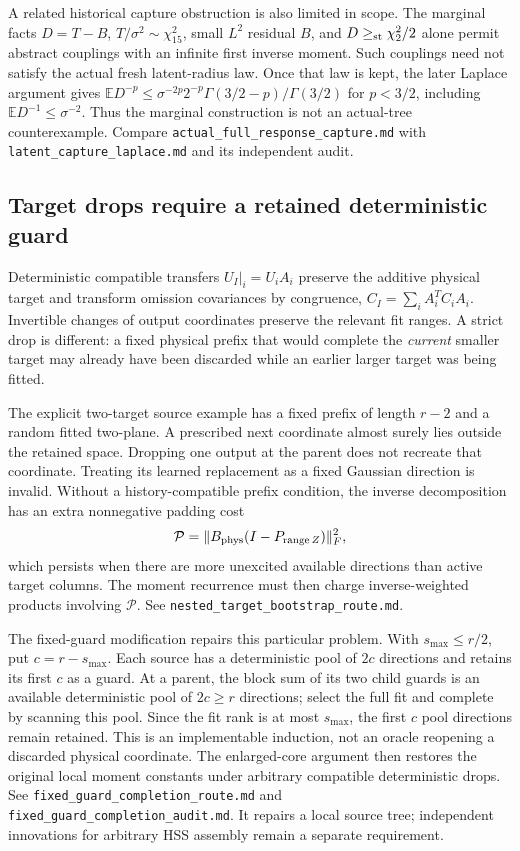 \documentclass[11pt,oneside,openany,a4paper]{book}
\numberwithin{equation}{chapter}
\theoremstyle{definition}
\theoremstyle{remark}
\newcommand{\sourcefile}[1]{{\small\nolinkurl{#1}}}
\begin{document}
A related historical capture obstruction is also limited in scope.
The marginal facts $D=T-B$, $T/\sigma^2\sim\chi^2_{15}$, small
$L^2$ residual $B$, and $D\ge_{\rm st}\chi^2_2/2$ alone permit abstract
couplings with an infinite first inverse moment.  Such couplings need
not satisfy the actual fresh latent-radius law.  Once that law is kept,
the later Laplace argument gives
$\mathbb ED^{-p}\le\sigma^{-2p}2^{-p}
\Gamma(3/2-p)/\Gamma(3/2)$ for $p<3/2$, including
$\mathbb ED^{-1}\le\sigma^{-2}$.  Thus the marginal construction is
not an actual-tree counterexample.  Compare
\sourcefile{actual_full_response_capture.md} with
\sourcefile{latent_capture_laplace.md} and its independent audit.

\subsection{Target drops require a retained deterministic guard}

Deterministic compatible transfers
$U_I|_i=U_iA_i$ preserve the additive physical target and transform
omission covariances by congruence,
$C_I=\sum_iA_i^TC_iA_i$.  Invertible changes of output coordinates
preserve the relevant fit ranges.  A strict drop is different: a fixed
physical prefix that would complete the \emph{current} smaller target
may already have been discarded while an earlier larger target was
being fitted.

The explicit two-target source example has a fixed prefix of length
$r-2$ and a random fitted two-plane.  A prescribed next coordinate
almost surely lies outside the retained space.  Dropping one output
at the parent does not recreate that coordinate.  Treating its learned
replacement as a fixed Gaussian direction is invalid.  Without a
history-compatible prefix condition, the inverse decomposition has an
extra nonnegative padding cost
\[
 \mathcal P=\|B_{\rm phys}(I-P_{\operatorname{range}Z})\|_F^2,
\]
which persists when there are more unexcited available directions than
active target columns.  The moment recurrence must then charge
inverse-weighted products involving $\mathcal P$.
See \sourcefile{nested_target_bootstrap_route.md}.

The fixed-guard modification repairs this particular problem.  With
$s_{\max}\le r/2$, put $c=r-s_{\max}$.  Each source has a deterministic
pool of $2c$ directions and retains its first $c$ as a guard.  At a
parent, the block sum of its two child guards is an available
deterministic pool of $2c\ge r$ directions; select the full fit and
complete by scanning this pool.  Since the fit rank is at most
$s_{\max}$, the first $c$ pool directions remain retained.  This is an
implementable induction, not an oracle reopening a discarded physical
coordinate.  The enlarged-core argument then restores the original
local moment constants under arbitrary compatible deterministic drops.
See \sourcefile{fixed_guard_completion_route.md} and
\sourcefile{fixed_guard_completion_audit.md}.  It repairs a local source
tree; independent innovations for arbitrary HSS assembly remain a
separate requirement.
\end{document}
